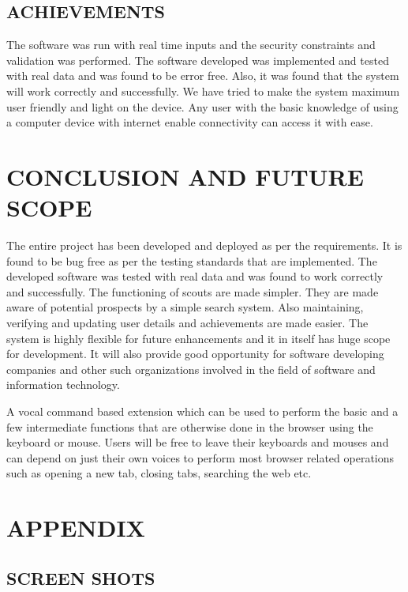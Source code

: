 \documentclass[11pt]{report} %
\begin{document}
\section{ACHIEVEMENTS}
\label{sec:ACHIEVEMENTS}
The software was run with real time inputs and the security constraints and validation was performed.
The software developed was implemented and tested with real data and was found to be error free. Also, it was found that the system will work correctly and successfully. We have tried to make the system maximum user friendly and light on the device. Any user with the basic knowledge of using a computer device with internet enable connectivity can access it with ease.

\chapter{CONCLUSION AND FUTURE SCOPE}
The entire project has been developed and deployed as per the requirements. It is found to be bug free as per the testing standards that are implemented. The developed software was tested with real data and was found to work correctly and successfully. 
The functioning of scouts are made simpler. They are made aware of potential prospects by a simple search system. Also maintaining, verifying and updating user details and achievements are made easier. The system is highly flexible for future enhancements and it in itself has huge scope for development. It will also provide good opportunity for software developing companies and other such organizations involved in the field of software and information technology.

A vocal command based extension which can be used to perform the basic and a few intermediate functions that are otherwise done in the browser using the keyboard or mouse.
Users will be free to leave their keyboards and mouses and can depend on just their own voices to perform most browser related operations such as opening a new tab, closing tabs, searching the web etc. 

\chapter{APPENDIX}


\section{SCREEN SHOTS} 
\label{App:Appendix1}



\begin{appendix}    
	
\end{appendix}




%
%
\end{document}
